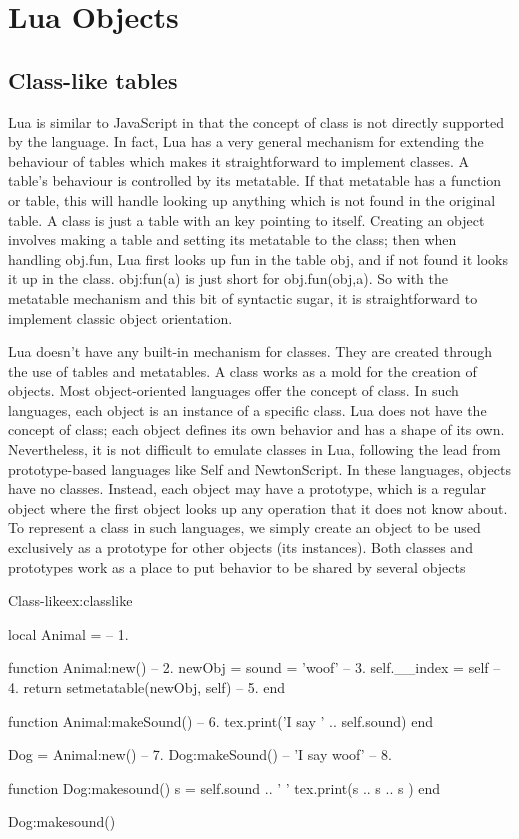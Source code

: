 \chapter{Lua Objects}
\label{c:luaobjects}

\section{Class-like tables}
Lua is similar to JavaScript in that the concept of class is not directly supported by the language. In fact, Lua has a very general mechanism for extending the behaviour of tables which makes it straightforward to implement classes. A table’s behaviour is controlled by its metatable. If that metatable has a  function or table, this will handle looking up anything which is not found in the original table. A class is just a table with an  key pointing to itself. Creating an object involves making a table and setting its metatable to the class; then when handling obj.fun, Lua first looks up fun in the table obj, and if not found it looks it up in the class. obj:fun(a) is just short for obj.fun(obj,a). So with the metatable mechanism and this bit of syntactic sugar, it is straightforward to implement classic object orientation.

Lua doesn't have any built-in mechanism for classes. They are created through the use of tables
and metatables. A class works as a mold for the creation of objects. Most object-oriented languages
offer the concept of class. In such languages, each object is an instance
of a specific class. Lua does not have the concept of class; each object defines
its own behavior and has a shape of its own. Nevertheless, it is not difficult to
emulate classes in Lua, following the lead from prototype-based languages like
Self and NewtonScript. In these languages, objects have no classes. Instead,
each object may have a prototype, which is a regular object where the first object
looks up any operation that it does not know about. To represent a class in
such languages, we simply create an object to be used exclusively as a prototype
for other objects (its instances). Both classes and prototypes work as a place to
put behavior to be shared by several objects
\begin{texexample}{Class-like}{ex:classlike}
\begin{luacode}
local Animal = {}                        -- 1. 

function Animal:new()                    -- 2.
  newObj = {sound = 'woof'}              -- 3.
  self.__index = self                    -- 4.
  return setmetatable(newObj, self)      -- 5.
end

function Animal:makeSound()              -- 6.
  tex.print('I say ' .. self.sound)
end

Dog = Animal:new()                       -- 7.
Dog:makeSound()  -- 'I say woof'         -- 8.

function Dog:makesound()
  s = self.sound .. ' '
  tex.print(s .. s .. s )
end

Dog:makesound()
  
\end{luacode}
\end{texexample}

